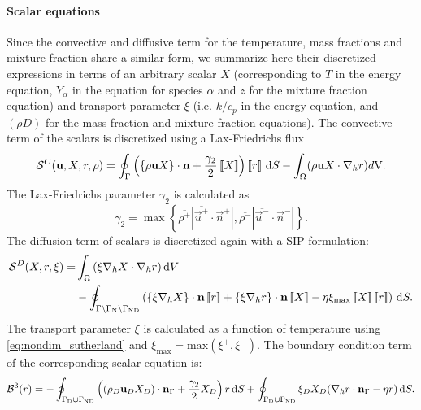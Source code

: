 \paragraph{Scalar equations}
Since the convective and diffusive term for the temperature, mass fractions and mixture fraction share a similar form, we summarize here their discretized expressions in terms of an arbitrary scalar $X$ (corresponding to $T$ in the energy equation, $Y_\alpha$ in the equation for species $\alpha$ and $z$ for the mixture fraction equation) and transport parameter $\xi$ (i.e. $k/c_p$ in the energy equation, and $(\rho D)$ for the mass fraction and mixture fraction equations). The convective term of the scalars is discretized using a Lax-Friedrichs flux
\begin{equation}
\mathcal{S}^C(\textbf{u},X,r, \rho) =  \oint_{\Gamma}{\left( \left\{{\rho\textbf{u}X }\right\}\cdot \textbf{n} + \frac{\gamma_2}{2}\left[\!\left[{{X}}\right]\!\right]\right)\left[\!\left[{{r}}\right]\!\right] \,\mathrm{d} S} 
- \int_{\Omega}({\rho \textbf{u} X \cdot \nabla_h r) d\text{V}}. \label{eq:scalar_convective} 
\end{equation}
The Lax-Friedrichs parameter $\gamma_2$ is calculated as \cite{kleinHighorderDiscontinuousGalerkin2016}
\begin{equation}
\gamma_2  = \max \left\{\overline{\rho^+} |\overline{\vec{u}^+} \cdot \vec{n}^+|,\overline{\rho^-} |\overline{\vec{u}^-} \cdot \vec{n}^-|\right\}.
\label{eq:vardens_lambda2}
\end{equation}
The diffusion term of scalars is discretized again with a SIP formulation:
\begin{align}
	\mathcal{S}^D(X,r,\xi)=  &\int_{\Omega}{ \left(\xi \nabla_h X \cdot\nabla_h r\right) }\dV \notag\\
	&-\oint_{\Gamma \setminus \Gamma_{\text{N}}\setminus \Gamma_{\text{ND}}}{\left(
		\mean{\xi \nabla_h X}\cdot \vec{n}\jump{r} +
		\mean{\xi \nabla_h r}\cdot \vec{n}\jump{X} - 
		\eta \xi_{\text{max}} \jump{X} \jump{r}
		\right) \dS.
	} \label{eq:Temp_diffusive}
\end{align}
The transport parameter $\xi$ is calculated as a function of temperature using \cref{eq:nondim_sutherland} and $\xi_{\text{max}} = \text{max}(\xi^{+}, \xi^{-})$. 
The boundary condition term of the corresponding scalar equation is:
\begin{equation}
\mathcal{B}^3(r) =  -
\oint_{\Gamma_{\text{D}}\cup \Gamma_{\text{ND}}}{ \left( (\rho_D\textbf{u}_D X_D)\cdot \textbf{n}_{\Gamma} + \frac{\gamma_2}{2}X_D\right)r \,\mathrm{d} S}   
+\oint_{\Gamma_{\text{D}}\cup \Gamma_{\text{ND}}} \xi_D X_D(\nabla_h r \cdot \textbf{n}_{\Gamma} - \eta r )\,\mathrm{d} S.
\end{equation}
